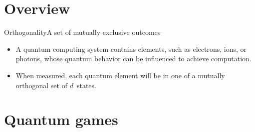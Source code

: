 
\section{Overview}

\begin{frame}{Orthogonality}{A set of mutually exclusive outcomes}
\begin{itemize}
    \item A quantum computing system contains elements, such as electrons, ions, or photons, whose quantum behavior can be influenced to achieve computation.
    \item When measured, each quantum element will be in one of a mutually orthogonal set of $d$~states.
    
\end{itemize}
\end{frame}

\section{Quantum games}

